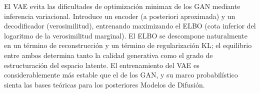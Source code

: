 El VAE evita las dificultades de optimización minimax de los GAN mediante inferencia variacional. Introduce un encoder (a posteriori aproximada) y un decodificador (verosimilitud), entrenando maximizando el ELBO (cota inferior del logaritmo de la verosimilitud marginal). El ELBO se descompone naturalmente en un término de reconstrucción y un término de regularización KL; el equilibrio entre ambos determina tanto la calidad generativa como el grado de estructuración del espacio latente. El entrenamiento del VAE es considerablemente más estable que el de los GAN, y su marco probabilístico sienta las bases teóricas para los posteriores Modelos de Difusión.

\newpage
